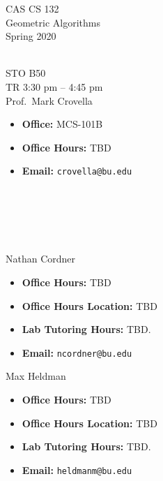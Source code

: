 \documentclass[11pt]{article}
\begin{document}
\sloppy 
\begin{center}
\LARGE CAS CS 132\\
\Large Geometric Algorithms\\
\Large\rm Spring 2020\\~\\
\end{center}

 STO B50\\[\baselineskip]
 TR 3:30 pm -- 4:45 pm 
\\[\baselineskip] 

 Prof.\ Mark Crovella\\[0.75\baselineskip]
\begin{minipage}[t]{0.60\textwidth}
\begin{itemize}
\item {\bf Office:} MCS-101B
\item {\bf Office Hours:} {\small TBD}
\item {\bf Email:} \texttt{crovella@bu.edu}
\end{itemize}
\end{minipage}
~\\~\\~\\~\\
 \begin{minipage}[t]{0.60\textwidth}
  Nathan Cordner 
 \begin{itemize}
 \item {\bf Office Hours:} {\small TBD}
 \item {\bf Office Hours Location:} TBD
 \item {\bf Lab Tutoring Hours:} {\small TBD.}
 \item {\bf Email:} \texttt{ncordner@bu.edu}
 \end{itemize}
 \end{minipage}
 \begin{minipage}[t]{0.60\textwidth}
  Max Heldman
 \begin{itemize}
 \item {\bf Office Hours:} {\small TBD}
 \item {\bf Office Hours Location:} TBD
 \item {\bf Lab Tutoring Hours:} {\small TBD.}
 \item {\bf Email:} \texttt{heldmanm@bu.edu}
 \end{itemize}
 \end{minipage}
\end{document}
